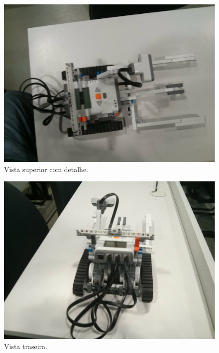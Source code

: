 \begin{apendicesenv}
\begin{figure}[h]
    \centering
    \includegraphics[keepaspectratio=true,scale=0.55]
      {figuras/robo_010.eps}
    \caption{Vista superior com detalhe.}
\end{figure}

\begin{figure}[h]
    \centering
    \includegraphics[keepaspectratio=true,scale=0.55]
      {figuras/robo_011.eps}
    \caption{Vista traseira.}
\end{figure}

\end{apendicesenv}
